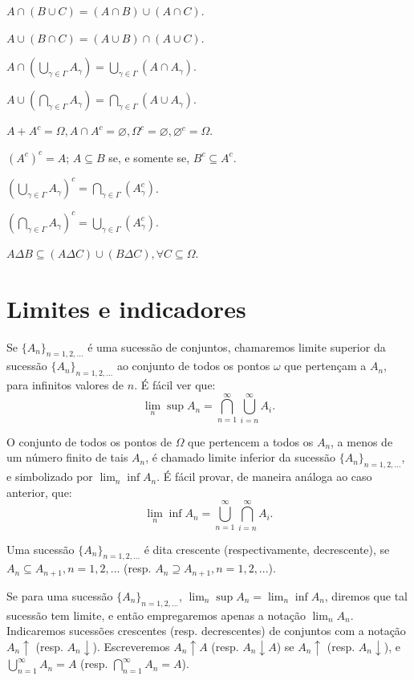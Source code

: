 \documentclass[
]{book}
\begin{document}
\(A \cap (B \cup C) = (A \cap B) \cup (A \cap C)\).

\(A \cup (B \cap C) = (A \cup B) \cap (A \cup C)\).

\(A \cap (\bigcup\limits_{\gamma \in \Gamma} A_{\gamma}) = \bigcup\limits_{\gamma \in \Gamma} (A \cap A_{\gamma})\).

\(A \cup (\bigcap\limits_{\gamma \in \Gamma} A_{\gamma}) = \bigcap\limits_{\gamma \in \Gamma} (A \cup A_{\gamma})\).

\(A + A^c = \Omega, A \cap A^c = \varnothing, \Omega^c = \varnothing, \varnothing^c = \Omega\).

\((A^c)^c = A\); \(A \subseteq B\) se, e somente se, \(B^c \subseteq A^c\).

\((\bigcup\limits_{\gamma \in \Gamma} A_{\gamma})^c = \bigcap\limits_{\gamma \in \Gamma} (A_{\gamma}^c)\).

\((\bigcap\limits_{\gamma \in \Gamma} A_{\gamma})^c = \bigcup\limits_{\gamma \in \Gamma} (A_{\gamma}^c)\).

\(A \Delta B \subseteq (A \Delta C) \cup (B \Delta C), \forall C \subseteq \Omega\).

\section{Limites e indicadores}\label{limites-e-indicadores}

Se \(\{A_n\}_{n=1,2,...}\) é uma sucessão de conjuntos, chamaremos limite superior da sucessão \(\{A_n\}_{n=1,2,...}\) ao conjunto de todos os pontos \(\omega\) que pertençam a \(A_n\), para infinitos valores de \(n\).
É fácil ver que: \[ \lim_n \sup A_n = \bigcap_{n=1}^{\infty} \bigcup_{i=n}^{\infty} A_i. \]

O conjunto de todos os pontos de \(\Omega\) que pertencem a todos os \(A_n\), a menos de um número finito de tais \(A_n\), é chamado limite inferior da sucessão \(\{A_n\}_{n=1,2,...}\), e simbolizado por \(\lim_n \inf A_n\).
É fácil provar, de maneira análoga ao caso anterior, que: \[ \lim_n \inf A_n = \bigcup_{n=1}^{\infty} \bigcap_{i=n}^{\infty} A_i. \]

Uma sucessão \(\{A_n\}_{n=1,2,...}\) é dita crescente (respectivamente, decrescente), se \(A_n \subseteq A_{n+1}, n=1, 2, ...\) (resp. \(A_n \supseteq A_{n+1}, n=1, 2, ...\)).

Se para uma sucessão \(\{A_n\}_{n=1,2,...}\), \(\lim_n \sup A_n = \lim_n \inf A_n\), diremos que tal sucessão tem limite, e então empregaremos apenas a notação \(\lim_n A_n\).
Indicaremos sucessões crescentes (resp. decrescentes) de conjuntos com a notação \(A_n \uparrow\) (resp. \(A_n \downarrow\)).
Escreveremos \(A_n \uparrow A\) (resp. \(A_n \downarrow A\)) se \(A_n \uparrow\) (resp. \(A_n \downarrow\)), e \(\bigcup\limits_{n=1}^{\infty} A_n = A\) (resp. \(\bigcap\limits_{n=1}^{\infty} A_n = A\)).
\end{document}
